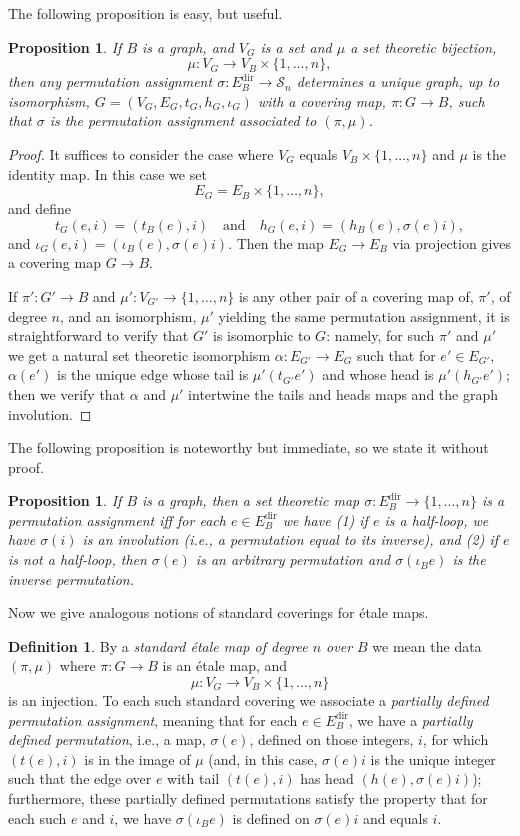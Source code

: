 \documentclass{memo-l}
\theoremstyle{plain}
\newtheorem{proposition}[theorem]{Proposition}
\theoremstyle{definition}
\newtheorem{definition}[theorem]{Definition}
\numberwithin{section}{chapter}
\numberwithin{equation}{chapter}
\newcommand{\from}{\colon}
\newcommand{\Edir}{E^{\mathrm{dir}}}
\theoremstyle{plain}
\theoremstyle{definition}
\newcommand\cS{\mathcal{S}}
\begin{document}
The following proposition is easy, but useful.
\begin{proposition}
\label{pr:associated_covering}
If $B$ is a graph, and $V_G$ is a set and $\mu$ a set theoretic bijection,
$$
\mu\from V_G\to V_B\times \{1,\ldots,n\},
$$
then
any permutation assignment $\sigma\from\Edir_B\to\cS_n$ determines
a unique graph, up to isomorphism, 
$G=(V_G,E_G,t_G,h_G,\iota_G)$ with a covering map,
$\pi\from G\to B$, such that $\sigma$ is the permutation assignment
associated to $(\pi,\mu)$.
\end{proposition}
\begin{proof}
It suffices to consider the case where $V_G$ equals
$V_B\times\{1,\ldots,n\}$ and $\mu$ is the identity map.
In this case we set
$$
E_G = E_B \times \{1,\ldots,n\},
$$
and define
$$
t_G(e,i) = (t_B(e),i) \quad\mbox{and}\quad
h_G(e,i) = (h_B(e),\sigma(e)i) ,
$$
and $\iota_G(e,i) = (\iota_B(e),\sigma(e)i)$.  Then the map
$E_G\to E_B$ via projection gives a covering map $G\to B$.

If $\pi'\from G'\to B$ and $\mu'\from V_{G'}\to \{1,\ldots,n\}$
is any other pair of a covering map of, $\pi'$, of degree $n$, 
and an isomorphism, $\mu'$ yielding
the same permutation assignment, it is straightforward to verify that
$G'$ is isomorphic to $G$: namely, for such $\pi'$ and $\mu'$
we get a natural set theoretic
isomorphism $\alpha\from E_{G'}\to E_G$ such that for $e'\in E_{G'}$,
$\alpha(e')$ is the unique edge whose tail is $\mu'(t_{G'}e')$ and
whose head is $\mu'(h_{G'}e')$;
then we verify that $\alpha$ and $\mu'$ intertwine
the tails
and heads maps and the graph involution.
\end{proof}

The following proposition is noteworthy but immediate, so we state
it without proof.
\begin{proposition}
If $B$ is a graph, then a set theoretic map 
$\sigma\from \Edir_B\to\{1,\ldots,n\}$ is a permutation assignment
iff for each $e\in\Edir_B$ we have
(1) if $e$ is a half-loop, we have
$\sigma(i)$ is an involution (i.e., a permutation equal to its 
inverse), and (2) if $e$ is not a half-loop, then $\sigma(e)$ is an
arbitrary permutation and $\sigma(\iota_B e)$ is the inverse
permutation.
\end{proposition}

Now we give analogous notions of standard coverings for \'etale maps.
\begin{definition}
By a 
{\em standard \'etale map of degree $n$ over $B$} we mean the data
$(\pi,\mu)$ where
$\pi\from G\to B$ is an \'etale map, and
$$
\mu\from V_G\to V_B\times \{1,\ldots,n\}
$$
is an injection.
To each such standard covering we associate a {\em partially defined
permutation assignment}, meaning that for each $e\in \Edir_B$, we
have a {\em partially defined permutation}, i.e.,
a map, $\sigma(e)$, defined on those integers, $i$, for which
$(t(e),i)$ is in the image of $\mu$ (and, in this case, $\sigma(e)i$
is the unique integer such that the edge over $e$ with tail
$(t(e),i)$ has head $(h(e),\sigma(e)i)$); furthermore,
these partially defined
permutations satisfy the property that 
for each such $e$ and $i$, we have $\sigma(\iota_B e)$ is defined
on $\sigma(e)i$ and equals $i$.
\end{definition}
\end{document}
